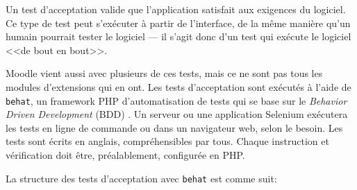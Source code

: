 Un test d'acceptation valide que l'application satisfait aux exigences du logiciel.
Ce type de test peut s'exécuter à partir de l'interface, de la même manière qu'un humain pourrait tester le logiciel --- il s'agit donc d'un test qui ex\'ecute le logiciel <<de bout en bout>>.



Moodle vient aussi avec plusieurs de ces tests, mais ce ne sont pas tous les modules d'extensions qui en ont.
%
Les tests d'acceptation sont exécutés à l'aide de \texttt{behat}, un \og framework \fg{} PHP d'automatisation de tests qui se base sur le \og \textit{Behavior Driven Development} (BDD) \fg{}.
Un serveur ou une application Selenium exécutera les tests en ligne de commande ou dans un navigateur web, selon le besoin.
Les tests sont écrits en anglais, compréhensibles par tous.
Chaque instruction et vérification doit être, préalablement, configurée en PHP.

La structure des tests d'acceptation avec \texttt{behat} est comme suit:

